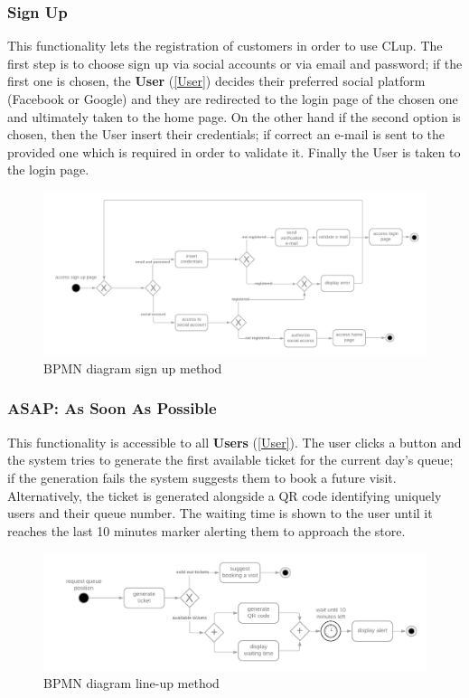 \documentclass[table, 12pt]{article}
\begin{document}
\subsubsection{Sign Up}
\label{sign_up}
This functionality lets the registration of customers in order to use CLup. The first step is to choose sign up via social accounts or via email and password; if the first one is chosen, the \textbf{User} (\ref{User}) decides their preferred social platform (Facebook or Google) and they are redirected to the login page of the chosen one and ultimately taken to the home page. On the other hand if the second option is chosen, then the User insert their credentials; if correct an e-mail is sent to the provided one which is required in order to validate it.
Finally the User is taken to the login page.
\begin{figure}[H]
    \begin{center}
        \includegraphics[width=\textwidth]{assets/Functions/function-sign-up.png}
        \caption{BPMN diagram sign up method}
    \end{center}
\end{figure}

\subsubsection{ASAP: As Soon As Possible}
\label{line_up}
This functionality is accessible to all \textbf{Users} (\ref{User}). The user clicks a button and the system tries to generate the first available ticket for the current day's queue; if the generation fails the system suggests them to book a future visit.
Alternatively, the ticket is generated alongside a QR code identifying uniquely users and their queue number. The waiting time is shown to the user until it reaches the last 10 minutes marker alerting them to approach the store.
\begin{figure}[H]
    \begin{center}
        \includegraphics[scale=0.25]{assets/Functions/function-line-up.png}
        \caption{BPMN diagram line-up method}
    \end{center}
\end{figure}
\end{document}
